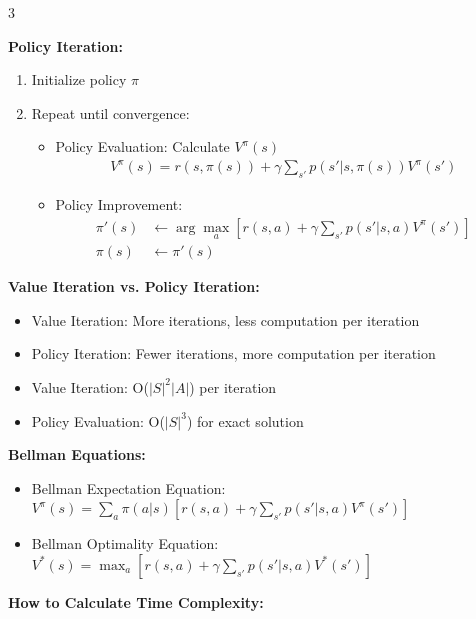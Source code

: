 \documentclass[10pt,landscape]{article}
\begin{document}
\begin{multicols}{3}
\begin{tcolorbox}[breakable, title=10.1 MDP Planning Algorithms, colback=mdp,boxsep=1pt,left=1pt,right=1pt,top=1pt,bottom=1pt]
\textbf{Policy Iteration:}
\begin{enumerate}[leftmargin=*,noitemsep,topsep=0pt]
    \item Initialize policy $\pi$
    \item Repeat until convergence:
    \begin{itemize}[leftmargin=*,noitemsep]
        \item Policy Evaluation: Calculate $V^\pi(s)$
        \begin{align}
        V^\pi(s) = r(s, \pi(s)) + \gamma \sum_{s'} p(s'|s, \pi(s))V^\pi(s')
        \end{align}
        \item Policy Improvement:
        \begin{align}
        \pi'(s) &\leftarrow \arg\max_a \left[r(s, a) + \gamma \sum_{s'} p(s'|s, a)V^\pi(s')\right]\\
        \pi(s) &\leftarrow \pi'(s)
        \end{align}
    \end{itemize}
\end{enumerate}

\textbf{Value Iteration vs. Policy Iteration:}
\begin{itemize}[leftmargin=*,noitemsep,topsep=0pt]
    \item Value Iteration: More iterations, less computation per iteration
    \item Policy Iteration: Fewer iterations, more computation per iteration
    \item Value Iteration: O($|S|^2|A|$) per iteration
    \item Policy Evaluation: O($|S|^3$) for exact solution
\end{itemize}

\textbf{Bellman Equations:}
\begin{itemize}[leftmargin=*,noitemsep,topsep=0pt]
    \item Bellman Expectation Equation:
    $V^\pi(s) = \sum_a \pi(a|s)[r(s,a) + \gamma\sum_{s'} p(s'|s,a)V^\pi(s')]$
    \item Bellman Optimality Equation:
    $V^*(s) = \max_a [r(s,a) + \gamma\sum_{s'} p(s'|s,a)V^*(s')]$
\end{itemize}
\end{tcolorbox}

\begin{tcolorbox}[breakable, title=Time Complexity Analysis, colback=white,boxsep=1pt,left=1pt,right=1pt,top=1pt,bottom=1pt]
\textbf{How to Calculate Time Complexity:}


\end{tcolorbox}
\end{multicols}
\end{document}
